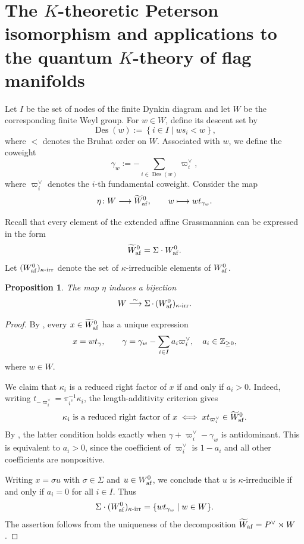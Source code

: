 \documentclass[a4paper]{amsart}
\newtheorem{prop}[thm]{Proposition}
\theoremstyle{remark}
\numberwithin{equation}{section}
\begin{document}
\appendix

\section{The $K$-theoretic Peterson isomorphism and applications to the quantum $K$-theory of flag manifolds}\label{Ap_qu_K_th}

Let \(I\) be the set of nodes of the finite Dynkin diagram and let \(W\) be the corresponding finite Weyl group. For \(w\in W\), define its descent set by
\[
\operatorname{Des}(w)
:=
\left\{ i\in I \mid  ws_i<w \right\},
\]
where \(<\) denotes the Bruhat order on \(W\). Associated with \(w\), we define the coweight
\[
\gamma_w
:=
-\sum_{i\in\operatorname{Des}(w)}
\varpi_i^\lor,
\]
where \(\varpi_i^\lor\) denotes the \(i\)-th fundamental coweight. Consider the map
\[
\eta\colon W\longrightarrow \widetilde{W}_{\mathrm{af}}^0,
\qquad
w\longmapsto wt_{\gamma_w}.
\]

Recall that every element of the extended affine Grassmannian can be expressed in the form
\[
\widetilde{W}_{\mathrm{af}}^0=\Sigma\cdot W_{\mathrm{af}}^0.
\]
Let $(W_{\mathrm{af}}^0)_{\kappa\text{-}\mathrm{irr}}$
denote the set of \(\kappa\)-irreducible elements of \(W_{\mathrm{af}}^0\).

\begin{prop}\label{prop:eta-kappa-irreducible}
The map \(\eta\) induces a bijection
\[
W
\overset{\sim}{\longrightarrow}
\Sigma\,{\cdot}\,
(W_{\mathrm{af}}^0)_{\kappa\text{-}\mathrm{irr}}.
\]
\end{prop}
{
\begin{proof}
By \cite[Lemma 2.33]{ISY}, every
$x\in\widetilde{W}_{\mathrm{af}}^0$ has a unique expression
\[
x=wt_\gamma,\qquad
\gamma=\gamma_w-\sum_{i\in I}a_i\varpi_i^\vee,
\quad a_i\in\mathbb{Z}_{\ge0},
\]
where $w\in W$.

We claim that $\kappa_i$ is a reduced right factor
of $x$ if and only if $a_i>0$. 
Indeed, writing $t_{-\varpi_i^\vee}=\pi_{i^s}^{-1}\kappa_i$,
the length-additivity criterion
\cite[Proposition~2.32]{ISY} gives
\[
\kappa_i\text{ is a reduced right factor of }x
\iff xt_{\varpi_i^\vee}\in\widetilde{W}_{\mathrm{af}}^0.
\]
By \cite[Lemma 2.33]{ISY}, the latter condition holds exactly when \(\gamma+\varpi_i^\vee-\gamma_w\) is antidominant. This is equivalent to \(a_i>0\), since the coefficient of \(\varpi_i^\vee\) is \(1-a_i\) and all other coefficients are nonpositive.


Writing $x=\sigma u$ with $\sigma\in\Sigma$
and $u\in W_{\mathrm{af}}^0$, we conclude that
$u$ is $\kappa$-irreducible if and only if
$a_i=0$ for all $i\in I$.
Thus
\[
\Sigma\cdot(W_{\mathrm{af}}^0)_{\kappa\text{-irr}}
=\{wt_{\gamma_w}\mid w\in W\}.
\]
The assertion follows from the uniqueness
of the decomposition $\widetilde{W}_{\mathrm{af}}=P^\vee\rtimes W$.
\end{proof}
}
\end{document}

